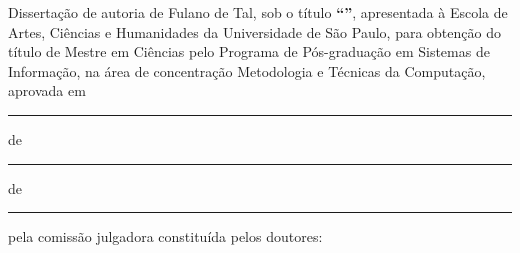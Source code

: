 \documentclass[
	12pt,				%
	oneside,			%
	a4paper,			%
	english,			%
	brazil				%
	]{abntex2ppgsi}
\begin{document}

\begin{folhadeaprovacao}
%
%
%
%
%
\noindent Dissertação de autoria de Fulano de Tal, sob o título \textbf{``\imprimirtitulo''}, apresentada à Escola de Artes, Ciências e Humanidades da Universidade de São Paulo, para obtenção do título de Mestre em Ciências pelo Programa de Pós-graduação em Sistemas de Informação, na área de concentração Metodologia e Técnicas da Computação, aprovada em \rule{0.85cm}{0.5pt} de \rule{3.5cm}{0.5pt} de \rule{1.25cm}{0.5pt} pela comissão julgadora constituída pelos doutores:

\vspace*{3cm}

\begin{center}
%
% 
% 
% 
% 
%
%
%


\end{center}
\end{folhadeaprovacao}
\end{document}
